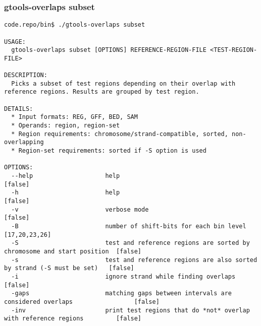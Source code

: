 \subsubsection{gtools-overlaps subset}\label{gtools-overlaps_subset}
\begin{lstlisting}
code.repo/bin$ ./gtools-overlaps subset

USAGE:
  gtools-overlaps subset [OPTIONS] REFERENCE-REGION-FILE <TEST-REGION-FILE>

DESCRIPTION:
  Picks a subset of test regions depending on their overlap with reference regions. Results are grouped by test region.

DETAILS:
  * Input formats: REG, GFF, BED, SAM
  * Operands: region, region-set
  * Region requirements: chromosome/strand-compatible, sorted, non-overlapping
  * Region-set requirements: sorted if -S option is used

OPTIONS:
  --help                    help                                                                    [false]
  -h                        help                                                                    [false]
  -v                        verbose mode                                                            [false]
  -B                        number of shift-bits for each bin level                                 [17,20,23,26]
  -S                        test and reference regions are sorted by chromosome and start position  [false]
  -s                        test and reference regions are also sorted by strand (-S must be set)   [false]
  -i                        ignore strand while finding overlaps                                    [false]
  -gaps                     matching gaps between intervals are considered overlaps                 [false]
  -inv                      print test regions that do *not* overlap with reference regions         [false]
\end{lstlisting}
%
% 
\clearpage
